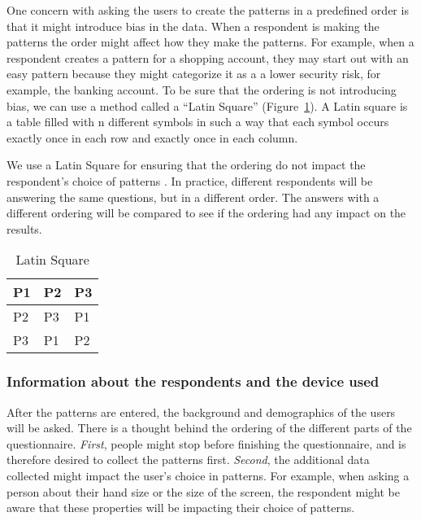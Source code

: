    One concern with asking the users to create the patterns in a predefined order is that it might introduce bias in the data. When a respondent is making the patterns the order might affect how they make the patterns. For example, when a respondent creates a pattern for a shopping account, they may start out with an easy pattern because they might categorize it as a a lower security risk, for example, the banking account. To be sure that the ordering is not introducing bias, we can use a method called a ``Latin Square'' (Figure~\ref{tab:latin}). A Latin square is a table filled with n different symbols in such a way that each symbol occurs exactly once in each row and exactly once in each column.

    We use a Latin Square for ensuring that the ordering do not impact the respondent's choice of patterns . In practice, different respondents will be answering the same questions, but in a different order. The answers with a different ordering will be compared to see if the ordering had any impact on the results. 

    \begin{table}[H]
      \centering
      \begin{tabular}{| m{1cm} | m{1cm} | m{1cm} |}
        \hline
        P1 & P2 & P3 \\ \hline
        P2 & P3 & P1 \\ \hline
        P3 & P1 & P2 \\ \hline
      \end{tabular}
      \caption{Latin Square}
      \label{tab:latin}
    \end{table}

    \subsubsection*{Information about the respondents and the device used}
    After the patterns are entered, the background and demographics of the users will be asked. There is a thought behind the ordering of the different parts of the questionnaire. {\it First}, people might stop before finishing the questionnaire, and is therefore desired to collect the patterns first. {\it Second}, the additional data collected might impact the user's choice in patterns. For example, when asking a person about their hand size or the size of the screen, the respondent might be aware that these properties will be impacting their choice of patterns.




